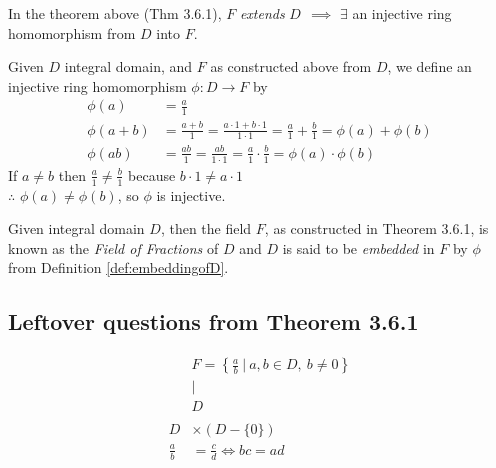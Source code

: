 In the theorem above (Thm 3.6.1), $F$ \textit{extends} $D \ \ \implies$ $\exists$ an injective ring
homomorphism from $D$ into $F$. \\
\begin{definition}
    \label{def:embeddingofD}
    Given $D$ integral domain, and $F$ as constructed above from $D$, we define an injective ring
    homomorphism $\phi: D \rightarrow F$ by
    \begin{align}
        \phi(a) &= \frac{a}{1} \nonumber \\
        \phi(a+b) &= \frac{a+b}{1} = \frac{a\cdot 1+b\cdot 1}{1\cdot 1} = \frac{a}{1}+\frac{b}{1} = \phi(a)+\phi(b) \nonumber \\
        \phi(ab) &= \frac{ab}{1} = \frac{ab}{1\cdot 1} = \frac{a}{1}\cdot \frac{b}{1} = \phi(a)\cdot \phi(b) \nonumber
    \end{align}
    If $a\neq b$ then $\frac{a}{1} \neq \frac{b}{1}$ because $b\cdot 1 \neq a \cdot 1$ \\
    $\therefore$ $\phi(a)\neq \phi(b)$, so $\phi$ is injective.
\end{definition}

\begin{definition}
Given integral domain $D$, then the field $F$, as constructed in Theorem 3.6.1, is known as the
\textit{Field of Fractions} of $D$ and $D$ is said to be \textit{embedded} in $F$ by $\phi$ from
Definition \ref{def:embeddingofD}.
\end{definition}
\newpage
\subsection{Leftover questions from Theorem 3.6.1}

\begin{align}
    &F = \left\{\frac{a}{b} \ | \ a,b\in D, \  b\neq 0 \right\} \nonumber \\
    &\vert \nonumber \\
    &D \nonumber \\
    & \nonumber \\
    D &\times (D-\{ 0 \}) \nonumber \\
    \frac{a}{b} &= \frac{c}{d} \iff bc=ad \nonumber
\end{align}

